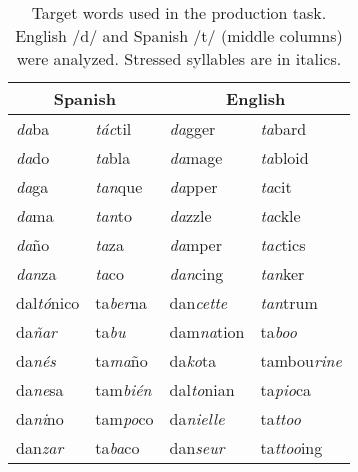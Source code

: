 \begin{table}[ht]
\centering
{\footnotesize{\caption{Target words used in the production task. English /d/ and Spanish /t/ (middle columns) were analyzed. Stressed syllables are in italics.\label{words}}}}
{\footnotesize{
\begin{tabular}{@{}|l|l||l|l|@{}}
\hline
\multicolumn{2}{c}{Spanish}       & \multicolumn{2}{c}{English} \\
\hline \hline
\emph{da}ba        & \emph{t\'ac}til  & \emph{da}gger    & \emph{ta}bard \\
\emph{da}do        & \emph{ta}bla     & \emph{da}mage    & \emph{ta}bloid \\
\emph{da}ga        & \emph{tan}que    & \emph{da}pper    & \emph{ta}cit \\
\emph{da}ma        & \emph{tan}to     & \emph{da}zzle    & \emph{ta}ckle \\
\emph{da}\~no      & \emph{ta}za      & \emph{da}mper    & \emph{tac}tics \\
\emph{dan}za       & \emph{ta}co      & \emph{dan}cing   & \emph{tan}ker \\
dal\emph{t\'o}nico & ta\emph{ber}na   & dan\emph{cette}  & \emph{tan}trum \\
da\emph{\~nar}       & ta\emph{bu}      & dam\emph{na}tion & ta\emph{boo} \\
da\emph{n\'es}     & ta\emph{ma}\~no  & da\emph{ko}ta    & tambou\emph{rine} \\
da\emph{ne}sa      & tam\emph{bi\'en} & dal\emph{to}nian & ta\emph{pio}ca \\
da\emph{ni}no      & tam\emph{po}co   & da\emph{nielle}  & ta\emph{ttoo} \\
dan\emph{zar}      & ta\emph{ba}co    & dan\emph{seur}   & ta\emph{ttoo}ing \\
\hline
\end{tabular}
}}
\vspace{.05in}
\end{table}